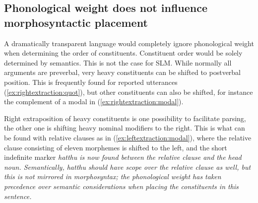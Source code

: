 \documentclass[a4paper]{article}
\begin{document}
\subsection{Phonological weight does not influence morphosyntactic placement}
A dramatically transparent language would completely ignore phonological weight when determining the order of constituents. Constituent order would be solely determined by semantics. This is not the case for SLM. While normally all arguments are preverbal, very heavy constituents can be shifted to postverbal position. This is frequently found for reported utterances (\ref{ex:rightextraction:quot}), but other constituents can also be shifted, for instance the complement of a modal in (\ref{ex:rightextraction:modal}).




Right extraposition of heavy constituents is one possibility to facilitate parsing, the other one is shifting heavy nominal modifiers to the right. This is what can be found with relative clauses as in (\ref{ex:leftextraction:modal}), where the relative clause consisting of eleven morphemes is shifted to the left, and the short indefinite marker \em hatthu \em is now found between the relative clause and the head noun. Semantically, \em hatthu \em should have scope over the relative clause as well, but this is not mirrored in morphosyntax; the phonological weight has taken precedence over semantic considerations when placing the constituents in this sentence.
\end{document}
